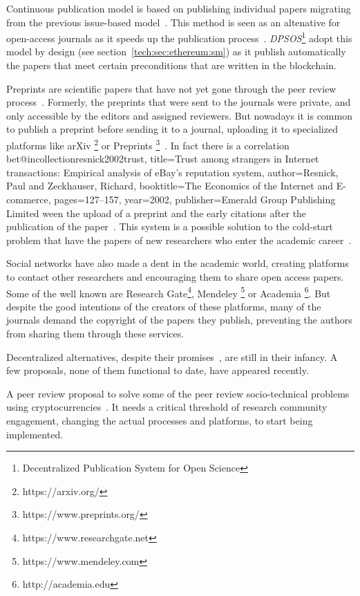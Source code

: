 Continuous publication model is based on publishing individual papers migrating
from the previous issue-based model~\cite{anderton2013continuous}. This method
is seen as an altenative for open-access journals as it speeds up the
publication process~\cite{haymanview}. \emph{DPSOS}\footnote{Decentralized
  Publication System for Open Science} adopt this model by design (see
section~\ref{tech:sec:ethereum:sm}) as it publish automatically the papers that
meet certain preconditions that are written in the blockchain.

Preprints are scientific papers that have not yet gone through the peer review
process~\cite{harnad2003electronic}. Formerly, the preprints that were sent to
the journals were private, and only accessible by the editors and assigned
reviewers. But nowadays it is common to publish a preprint before sending it to
a journal, uploading it to specialized platforms like arXiv
\footnote{https://arxiv.org/} or Preprints
\footnote{https://www.preprints.org/}~\cite{brown2001volution}. In fact there is
a correlation bet@incollection{resnick2002trust, title={Trust among strangers in
    Internet transactions: Empirical analysis of eBay's reputation system},
  author={Resnick, Paul and Zeckhauser, Richard}, booktitle={The Economics of
    the Internet and E-commerce}, pages={127--157}, year={2002},
  publisher={Emerald Group Publishing Limited} }ween the upload of a preprint
and the early citations after the publication of the
paper~\cite{shuai2012scientific}. This system is a possible solution to the
cold-start problem that have the papers of new researchers who enter the
academic career~\cite{sugiyama2010scholarly}.

Social networks have also made a dent in the academic world, creating platforms
to contact other researchers and encouraging them to share open access papers.
Some of the well known are Research Gate\footnote{https://www.researchgate.net},
Mendeley \footnote{https://www.mendeley.com} or Academia
\footnote{http://academia.edu}. But despite the good intentions of the creators
of these platforms, many of the journals demand the copyright of the papers they
publish, preventing the authors from sharing them through these services.


Decentralized alternatives, despite their promises~\cite{bartlingblockchain},
are still in their infancy. A few proposals, none of them functional to date,
have appeared recently.

A peer review proposal to solve some of the peer review socio-technical problems
using cryptocurrencies~\cite{tennant2017multi}. It needs a critical threshold of
research community engagement, changing the actual processes and platforms, to
start being implemented.

